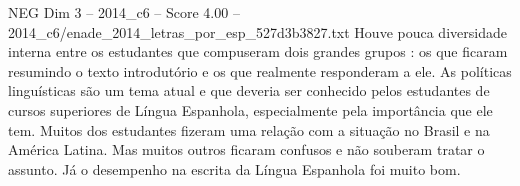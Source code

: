 \begin{textsample}{NEG Dim 3 – 2014\_c6 – Score 4.00 – 2014\_c6/enade\_2014\_letras\_por\_esp\_527d3b3827.txt}
Houve pouca diversidade interna entre os estudantes que compuseram dois grandes grupos : os que ficaram resumindo o texto introdutório e os que realmente responderam a ele.
As políticas linguísticas são um tema atual e que deveria ser conhecido pelos estudantes de cursos superiores de Língua Espanhola, especialmente pela importância que ele tem.
Muitos dos estudantes fizeram uma relação com a situação no Brasil e na América Latina.
Mas muitos outros ficaram confusos e não souberam tratar o assunto.
Já o desempenho na escrita da Língua Espanhola foi muito bom.

\end{textsample}
